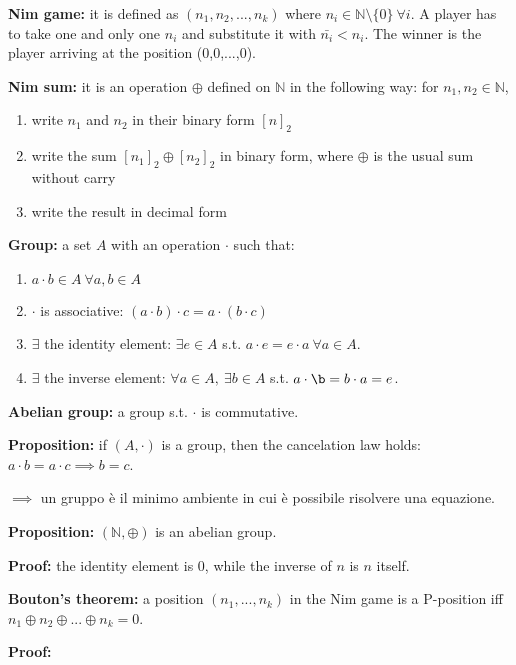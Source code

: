 \bigskip
\noindent \textbf{Nim game:} it is defined as $(n_1,n_2,...,n_k)$ where 
$n_i \in \mathbb{N}\setminus\{0\} ~\forall i$. A player has to take one and only 
one $n_i$ and substitute it with $\bar{n_i} < n_i$. The winner is the player 
arriving at the position (0,0,...,0).

\noindent \textbf{Nim sum:} it is an operation $\oplus$ defined on $\mathbb{N}$ 
in the following way: for $n_1,n_2 \in \mathbb{N}$,
\begin{enumerate}
	\item write $n_1$ and $n_2$ in their binary form $[n]_2$
	\item write the sum $[n_1]_2 \oplus [n_2]_2$ in binary form, where $\oplus$ 
	is the usual sum without carry
	\item write the result in decimal form
\end{enumerate}

\noindent \textbf{Group:} a set $A$ with an operation $\cdot$ such that:
\begin{enumerate}
	\item $a \cdot b \in A ~\forall a,b \in A$
	\item $\cdot$ is associative: $(a \cdot b) \cdot c = a \cdot (b \cdot c)$
	\item $\exists$ the identity element: $\exists e \in A$ s.t. 
	$a \cdot e = e \cdot a ~\forall a \in A$.
	\item $\exists$ the inverse element: $\forall a \in A, ~\exists b \in A$ 
	s.t. $a \cdot \b = b \cdot a = e$.
\end{enumerate}
\textbf{Abelian group:} a group s.t. $\cdot$ is commutative.

\noindent \textbf{Proposition:} if $(A,\cdot)$ is a group, then the cancelation 
law holds: $a \cdot b = a \cdot c \implies b = c$.

\noindent $\implies$ un gruppo è il minimo ambiente in cui è possibile risolvere 
una equazione.

\noindent \textbf{Proposition:} $(\mathbb{N},\oplus)$ is an abelian group.

\noindent \textbf{Proof:} the identity element is 0, while the inverse of $n$ 
is $n$ itself.

\bigskip
\noindent \textbf{Bouton's theorem:} a position $(n_1,...,n_k)$ in the Nim game 
is a P-position iff $n_1 \oplus n_2 \oplus ... \oplus n_k = 0$.

\noindent \textbf{Proof:}

